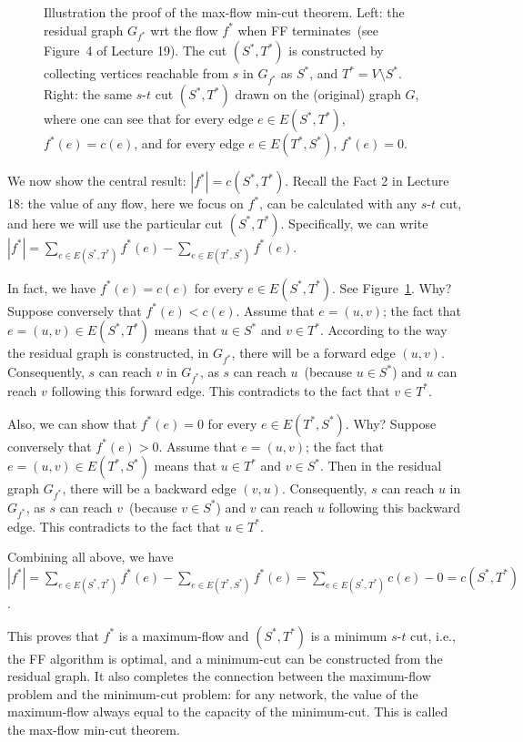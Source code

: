 \begin{figure}[h]
\centering{}
\caption{Illustration the proof of the max-flow min-cut theorem.
Left: the residual graph $G_{f^*}$ wrt the flow $f^*$ when FF terminates~(see Figure~4 of Lecture 19).
The cut $(S^*,T^*)$ is constructed by collecting vertices reachable from $s$ in $G_{f^*}$ as $S^*$, and $T^*=V\setminus S^*$.
Right: the same $s$-$t$ cut $(S^*, T^*)$ drawn on the (original) graph $G$, where one can see that for every edge $e\in E(S^*, T^*)$, $f^*(e) = c(e)$,
and for every edge $e\in E(T^*, S^*)$, $f^*(e) = 0$.}
\label{fig:theorem}
\end{figure}


We now show the central result: $|f^*| = c(S^*,T^*)$. Recall the Fact 2 in Lecture
18: the value of any flow, here we focus on $f^*$, can be calculated with any $s$-$t$
cut, and here we will use the particular cut $(S^*,T^*)$.
Specifically, we can write $|f^*| = \sum_{e\in E(S^*, T^*)} f^*(e) - \sum_{e\in E(T^*, S^*)} f^*(e)$.


In fact, we have $f^*(e) = c(e)$ for every $e \in E(S^*,T^*)$. 
See Figure~\ref{fig:theorem}. Why? Suppose conversely that $f^*(e) < c(e)$.
Assume that $e = (u,v)$; the fact that $e = (u,v) \in E(S^*,T^*)$
means that $u \in S^*$ and $v \in T^*$. According to the way the residual graph is constructed, in $G_{f^*}$, there will be
a forward edge $(u,v)$. Consequently, $s$ can reach $v$ in $G_{f^*}$, as $s$ can reach $u$~(because $u\in S^*$) and $u$ can reach 
$v$ following this forward edge. This contradicts to the fact that $v \in T^*$.

Also, we can show that $f^*(e) = 0$ for every $e \in E(T^*,S^*)$. %
Why? Suppose conversely that $f^*(e)>0$. Assume that $e=(u,v)$; the fact that $e=(u,v) \in E(T^*,S^*)$ means
that $u \in T^*$ and $v\in S^*$. Then in the residual graph $G_{f^*}$, there will be a backward edge 
$(v, u)$. Consequently, $s$ can reach $u$ in $G_{f^*}$, as $s$ can reach $v$~(because $v\in S^*$) and $v$ can reach $u$ following this backward edge. 
This contradicts to the fact that $u \in T^*$.

Combining all above, we have 
$|f^*| = \sum_{e\in E(S^*, T^*)} f^*(e) - \sum_{e\in E(T^*, S^*)} f^*(e)
 = \sum_{e\in E(S^*, T^*)} c(e) - 0 = c(S^*, T^*)$.

This proves that $f^*$ is a maximum-flow and $(S^*,T^*)$ is a minimum $s$-$t$ cut, i.e., the
FF algorithm is optimal, and a minimum-cut can be constructed from the residual
graph. It also completes the connection between the maximum-flow problem and
the minimum-cut problem: for any network, the value of the maximum-flow
always equal to the capacity of the minimum-cut. This is called the max-flow
min-cut theorem.


